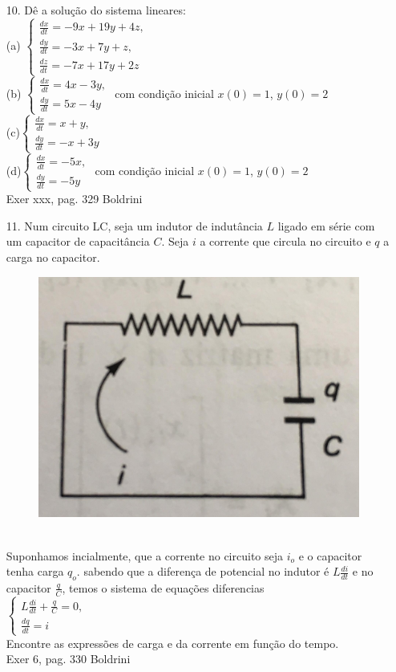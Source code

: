 \begin{itemize}
	\item[10.] Dê a solução do sistema lineares:\\
	(a) $\begin{cases}
	\frac{dx}{dt}=-9x+19y+4z,\\
	\frac{dy}{dt}=-3x+7y+z,\\
	\frac{dz}{dt}=-7x+17y+2z
	\end{cases}$\\
	(b) $\begin{cases}
	\frac{dx}{dt}=4x-3y,\\
	\frac{dy}{dt}=5x-4y
	\end{cases}$ com condição inicial $x(0)=1$, $y(0)=2$\\
	(c)$\begin{cases}
	\frac{dx}{dt}=x+y,\\
	\frac{dy}{dt}=-x+3y
	\end{cases}$\\
	(d)$\begin{cases}
	\frac{dx}{dt}=-5x,\\
	\frac{dy}{dt}=-5y
	\end{cases}$ com condição inicial $x(0)=1$, $y(0)=2$\\
		 Exer xxx, pag. 329 Boldrini
\end{itemize}
\begin{itemize}
	\item[11.] Num circuito LC, seja um indutor de indutância $L$ ligado em série com um capacitor de capacitância $C$. Seja $i$ a corrente que circula no circuito e $q$ a carga no capacitor.\\
	\begin{figure}[!h]
		\begin{center}		
			\includegraphics[width=0.3\linewidth,angle=0]{Figura1.jpg}
		\end{center}
	\end{figure}\\
    Suponhamos incialmente, que a corrente no circuito seja $i_{o}$ e o capacitor tenha carga $q_{o}$. sabendo que a diferença de potencial no indutor é $L\frac{di}{dt}$ e no capacitor $\frac{q}{C}$, temos o sistema de equações diferencias\\
    $\begin{cases}
    L\frac{di}{dt}+\frac{q}{C}=0,\\
    \frac{dq}{dt}=i
    \end{cases}$\\	
	Encontre as expressões de carga e da corrente em função do tempo.\\
		 Exer 6, pag. 330 Boldrini
\end{itemize}
